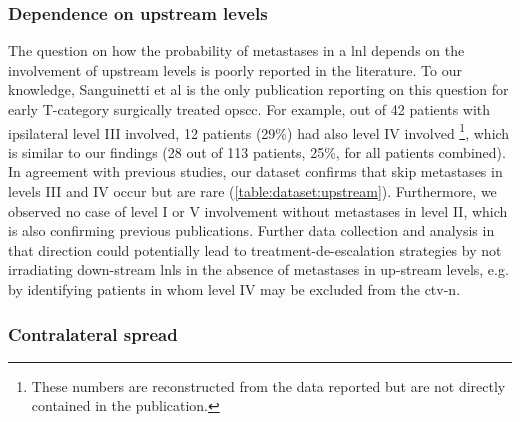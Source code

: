\documentclass[\relativeRoot/main.tex]{subfiles}
\begin{document}
\subsubsection*{Dependence on upstream levels}

The question on how the probability of metastases in a \gls{lnl} depends on the involvement of upstream levels is poorly reported in the literature. To our knowledge, Sanguinetti et al \cite{sanguineti_defining_2009} is the only publication reporting on this question for early T-category surgically treated \gls{opscc}. For example, out of 42 patients with ipsilateral level III involved, 12 patients (29\%) had also level IV involved \footnote{These numbers are reconstructed from the data reported but are not directly contained in the publication.
}, which is similar to our findings (28 out of 113 patients, 25\%, for all patients combined). In agreement with previous studies, our dataset confirms that skip metastases in levels III and IV occur but are rare (\cref{table:dataset:upstream}). Furthermore, we observed no case of level I or V involvement without metastases in level II, which is also confirming previous publications. Further data collection and analysis in that direction could potentially lead to treatment-de-escalation strategies by not irradiating down-stream \glspl{lnl} in the absence of metastases in up-stream levels, e.g. by identifying patients in whom level IV may be excluded from the \gls{ctv-n}.

\subsubsection*{Contralateral spread}
\end{document}
